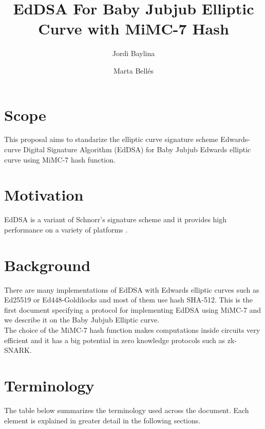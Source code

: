 \documentclass{article}
\title{ EdDSA For Baby Jubjub Elliptic Curve with MiMC-7 Hash \vspace{-0.2cm} }
\author[1]{Jordi Baylina}
\author[1,2]{Marta Bellés}
\affil[1]{iden3}
\affil[2]{Universitat Pompeu Fabra}
\date{} %
\begin{document}
\begin{spacing}{1.2}
\maketitle 
\vspace{1cm}
\tableofcontents

\vspace{0.5cm}

\newpage

\section{Scope}
This proposal aims to standarize the elliptic curve signature scheme Edwards-curve Digital Signature Algorithm (EdDSA) for Baby Jubjub Edwards elliptic curve using MiMC-7 hash function.

\section{Motivation}
EdDSA is a variant of Schnorr's signature scheme and it provides high performance on a variety of platforms \cite{eddsa}. 

\section{Background}
There are many implementations of EdDSA with Edwards elliptic curves such as Ed25519 or Ed448-Goldilocks and most of them use hash SHA-512. This is the first document specifying a protocol for implementing EdDSA using MiMC-7 and we describe it on the Baby Jubjub Elliptic curve.  \\

The choice of the MiMC-7 hash function makes computations inside circuits very efficient and it has a big potential in zero knowledge protocols such as zk-SNARK.
%	
%	
	
\section{Terminology}	%
The table below summarizes the terminology used across the document. Each element is explained in greater detail in the following sections.
	

\end{spacing}
\end{document}
